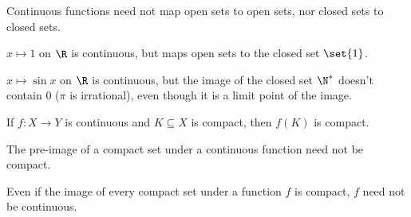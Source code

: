 \begin{remark}
    Continuous functions need not map open sets to open sets,
    nor closed sets to closed sets.

    $x \mapsto 1$ on $\R$ is continuous, but maps open sets to the closed
    set $\set{1}$.

    $x \mapsto \sin x$ on $\R$ is continuous, but the image of the closed
    set $\N^*$ doesn't contain $0$ ($\pi$ is irrational),
    even though it is a limit point of the image.
\end{remark}

\begin{theorem}[Compactness] \label{thm:cont:topology:compactness}
    If $f\colon X \to Y$ is continuous and $K \subseteq X$ is compact,
    then $f(K)$ is compact.
\end{theorem}
\begin{remarks}
    \item The pre-image of a compact set under a continuous function need
    not be compact.
    \item Even if the image of every compact set under a function $f$ is
    compact, $f$ need not be continuous.
\end{remarks}

